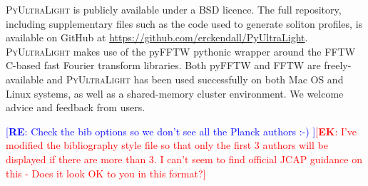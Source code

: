 \documentclass[a4paper,11pt]{article}
\newcommand{\PyUltraLight}{\textsc{PyUltraLight}\xspace}
\newcommand{\re}[1]{\textcolor{blue}{[{\bf RE}: #1]}}
\newcommand{\ek}[1]{\textcolor{red}{[{\bf EK}: #1]}}
\begin{document}
\PyUltraLight is publicly available under a BSD licence. The full repository, including supplementary files such as the code used to generate soliton profiles, is available on GitHub at {\url{ https://github.com/erckendall/PyUltraLight}}. \PyUltraLight makes use of the pyFFTW pythonic wrapper around the FFTW C-based fast Fourier transform libraries. Both pyFFTW and FFTW are freely-available and \PyUltraLight has been used successfully on both Mac OS and Linux systems, as well as a shared-memory cluster environment. We welcome advice and feedback from users. 






\re{Check the bib options so we don't see all the Planck authors :-) }\ek{I've modified the bibliography style file so that only the first 3 authors will be  displayed if there are more than 3. I can't seem to find official JCAP guidance on this - Does it look OK to you in this format?}


 








\end{document}

